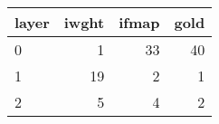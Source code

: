 \begin{tabular}{lrrr}
\toprule
layer &  iwght &  ifmap &  gold \\
\midrule
    0 &      1 &     33 &    40 \\
    1 &     19 &      2 &     1 \\
    2 &      5 &      4 &     2 \\
\bottomrule
\end{tabular}
